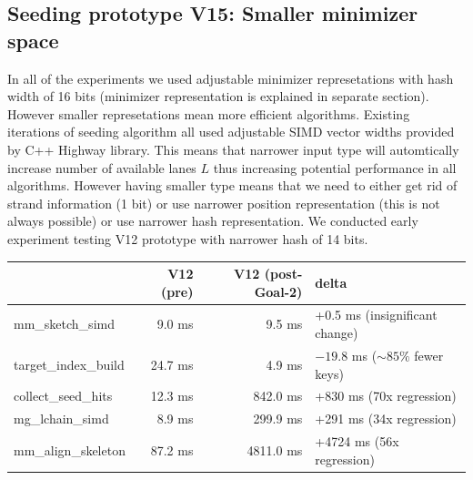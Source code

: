 \subsection{Seeding prototype V15: Smaller minimizer space}
\label{sec:v15-kmer-collapse-binary}

In all of the experiments we used adjustable minimizer represetations with hash width of 16 bits (minimizer representation is explained in separate section). However smaller represetations mean more efficient algorithms.
Existing iterations of seeding algorithm all used adjustable SIMD vector widths provided by C++ Highway library. This means that narrower input type will automtically increase number of available lanes $L$ thus increasing potential performance in all algorithms.
However having smaller type means that we need to either get rid of strand information (1 bit) or use narrower position representation (this is not always possible) or use narrower hash representation. 
We conducted early experiment testing V12 prototype with narrower hash of 14 bits.

\begin{center}
  \footnotesize\ttfamily
  \setlength{\tabcolsep}{4pt}
  \begin{tabular}{@{}lrrl@{}}
    \toprule
      & V12 (pre) & V12 (post-Goal-2) & delta \\
    \midrule
    mm\_sketch\_simd     &  9.0 ms &    9.5 ms & +0.5 ms (insignificant change) \\
    target\_index\_build & 24.7 ms &    4.9 ms & $-19.8$ ms ($\sim85\%$ fewer keys) \\
    collect\_seed\_hits  & 12.3 ms &  842.0 ms & +830 ms (70x regression) \\
    mg\_lchain\_simd     &  8.9 ms &  299.9 ms & +291 ms (34x regression) \\
    mm\_align\_skeleton  & 87.2 ms & 4811.0 ms & +4724 ms (56x regression) \\
    \bottomrule
  \end{tabular}
\end{center}


